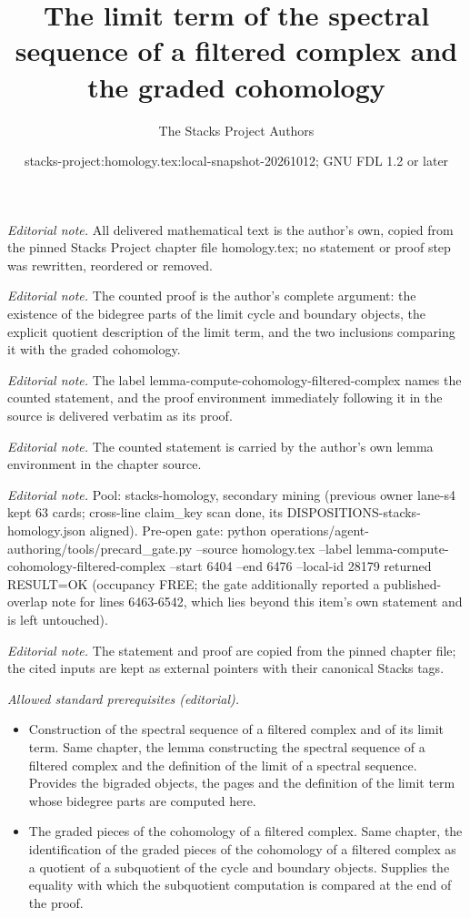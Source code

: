 \documentclass[10pt,a4paper]{amsart}
\title{The limit term of the spectral sequence of a filtered complex and the graded cohomology}
\author{The Stacks Project Authors}
\date{stacks-project:homology.tex:local-snapshot-20261012; GNU FDL 1.2 or later}
\theoremstyle{plain}
\theoremstyle{definition}
\theoremstyle{remark}
\numberwithin{equation}{subsection}
\begin{document}
\maketitle
\noindent\textit{Editorial note.} All delivered mathematical text is the author's own, copied from the pinned Stacks Project chapter file homology.tex; no statement or proof step was rewritten, reordered or removed.\par\medskip
\noindent\textit{Editorial note.} The counted proof is the author's complete argument: the existence of the bidegree parts of the limit cycle and boundary objects, the explicit quotient description of the limit term, and the two inclusions comparing it with the graded cohomology.\par\medskip
\noindent\textit{Editorial note.} The label lemma-compute-cohomology-filtered-complex names the counted statement, and the proof environment immediately following it in the source is delivered verbatim as its proof.\par\medskip
\noindent\textit{Editorial note.} The counted statement is carried by the author's own lemma environment in the chapter source.\par\medskip
\noindent\textit{Editorial note.} Pool: stacks-homology, secondary mining (previous owner lane-s4 kept 63 cards; cross-line claim\_key scan done, its DISPOSITIONS-stacks-homology.json aligned). Pre-open gate: python operations/agent-authoring/tools/precard\_gate.py --source homology.tex --label lemma-compute-cohomology-filtered-complex --start 6404 --end 6476 --local-id 28179 returned RESULT=OK (occupancy FREE; the gate additionally reported a published-overlap note for lines 6463-6542, which lies beyond this item's own statement and is left untouched).\par\medskip
\noindent\textit{Editorial note.} The statement and proof are copied from the pinned chapter file; the cited inputs are kept as external pointers with their canonical Stacks tags.\par\medskip
\noindent\textit{Allowed standard prerequisites (editorial).}\begin{itemize}
\item Construction of the spectral sequence of a filtered complex and of its limit term. Same chapter, the lemma constructing the spectral sequence of a filtered complex and the definition of the limit of a spectral sequence. Provides the bigraded objects, the pages and the definition of the limit term whose bidegree parts are computed here.
\item The graded pieces of the cohomology of a filtered complex. Same chapter, the identification of the graded pieces of the cohomology of a filtered complex as a quotient of a subquotient of the cycle and boundary objects. Supplies the equality with which the subquotient computation is compared at the end of the proof.
\end{itemize}\medskip
\end{document}
